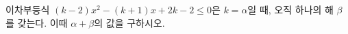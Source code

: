 이차부등식 $(k-2)x^2-(k+1)x+2k-2\le 0$은 $k=\alpha$일 때, 오직 하나의 해 $\beta$를 갖는다. 이때 $\alpha+\beta$의 값을 구하시오. 
